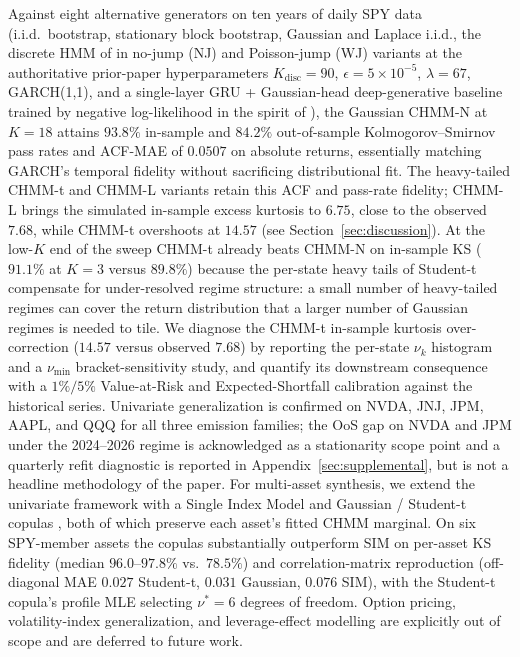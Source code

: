Against eight alternative generators on ten years of daily SPY data (i.i.d.\ bootstrap, stationary block bootstrap, Gaussian and Laplace i.i.d., the discrete HMM of \citet{alswaidan2026hybrid} in no-jump (NJ) and Poisson-jump (WJ) variants at the authoritative prior-paper hyperparameters $K_{\text{disc}} = 90$, $\epsilon = 5 \times 10^{-5}$, $\lambda = 67$, GARCH(1,1), and a single-layer GRU + Gaussian-head deep-generative baseline trained by negative log-likelihood in the spirit of \citet{yoon2019timegan}), the Gaussian CHMM-N at $K = 18$ attains $93.8\%$ in-sample and $84.2\%$ out-of-sample Kolmogorov--Smirnov pass rates and ACF-MAE of $0.0507$ on absolute returns, essentially matching GARCH's temporal fidelity without sacrificing distributional fit.
The heavy-tailed CHMM-t and CHMM-L variants retain this ACF and pass-rate fidelity; CHMM-L brings the simulated in-sample excess kurtosis to $6.75$, close to the observed $7.68$, while CHMM-t overshoots at $14.57$ (see Section~\ref{sec:discussion}).
At the low-$K$ end of the sweep CHMM-t already beats CHMM-N on in-sample KS ($91.1\%$ at $K = 3$ versus $89.8\%$) because the per-state heavy tails of Student-t compensate for under-resolved regime structure: a small number of heavy-tailed regimes can cover the return distribution that a larger number of Gaussian regimes is needed to tile.
We diagnose the CHMM-t in-sample kurtosis over-correction ($14.57$ versus observed $7.68$) by reporting the per-state $\nu_k$ histogram and a $\nu_{\min}$ bracket-sensitivity study, and quantify its downstream consequence with a $1\%/5\%$ Value-at-Risk and Expected-Shortfall calibration against the historical series.
Univariate generalization is confirmed on NVDA, JNJ, JPM, AAPL, and QQQ for all three emission families; the OoS gap on NVDA and JPM under the 2024--2026 regime is acknowledged as a stationarity scope point and a quarterly refit diagnostic is reported in Appendix~\ref{sec:supplemental}, but is not a headline methodology of the paper.
For multi-asset synthesis, we extend the univariate framework with a Single Index Model \cite{sharpe1963simplified} and Gaussian / Student-t copulas \cite{sklar1959fonctions, demarta2005tcopula, mcneil2015quantitative}, both of which preserve each asset's fitted CHMM marginal.
On six SPY-member assets the copulas substantially outperform SIM on per-asset KS fidelity (median $96.0$--$97.8\%$ vs.\ $78.5\%$) and correlation-matrix reproduction (off-diagonal MAE $0.027$ Student-t, $0.031$ Gaussian, $0.076$ SIM), with the Student-t copula's profile MLE selecting $\nu^{*} = 6$ degrees of freedom.
Option pricing, volatility-index generalization, and leverage-effect modelling are explicitly out of scope and are deferred to future work.

